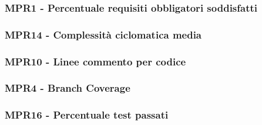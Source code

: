 \subsubsection{MPR1 - Percentuale requisiti obbligatori soddisfatti}
\subsubsection{MPR14 - Complessità ciclomatica media}
\subsubsection{MPR10 - Linee commento per codice}
\subsubsection{MPR4 - Branch Coverage}
\subsubsection{MPR16 - Percentuale test passati}

